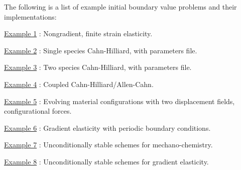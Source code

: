 The following is a list of example initial boundary value problems and their implementations\-:

\hyperlink{example1}{Example 1} \-: Nongradient, finite strain elasticity.

\hyperlink{example2}{Example 2} \-: Single species Cahn-\/\-Hilliard, with parameters file.

\hyperlink{example3}{Example 3} \-: Two species Cahn-\/\-Hilliard, with parameters file.

\hyperlink{example4}{Example 4} \-: Coupled Cahn-\/\-Hilliard/\-Allen-\/\-Cahn.

\hyperlink{example5}{Example 5} \-: Evolving material configurations with two displacement fields, configurational forces.

\hyperlink{example6}{Example 6} \-: Gradient elasticity with periodic boundary conditions.

\hyperlink{example7}{Example 7} \-: Unconditionally stable schemes for mechano-\/chemistry.

\hyperlink{example8}{Example 8} \-: Unconditionally stable schemes for gradient elasticity. 